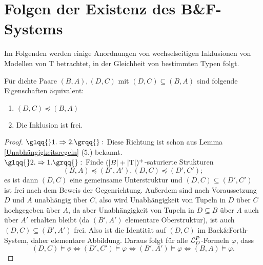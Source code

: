 \section{Folgen der Existenz des B\&F-Systems}
Im Folgenden werden einige Anordnungen von wechselseitigen Inklusionen von Modellen von T betrachtet, in der Gleichheit von bestimmten Typen folgt.

\begin{lemma}\label{freie Inklusionen}
	Für dichte Paare $(B,A),(D,C)$ mit $(D,C)\subseteq(B,A)$ sind folgende Eigenschaften äquivalent:
	\begin{enumerate}
		\item $(D,C)\preceq(B,A)$
		\item Die Inklusion ist frei.
	\end{enumerate}
\end{lemma}
\begin{proof}
	$\glqq{}1.\Rightarrow2.\grqq{}:$ Diese Richtung ist schon aus Lemma \ref{Unabhängigkeitsregeln} (5.) bekannt.\\
	$\glqq{}2.\Rightarrow1.\grqq{}:$ Finde $({\left| B \right|}+{\left| \operatorname{T} \right|})^+$-saturierte Strukturen $$(B,A)\preceq(B',A'),(D,C)\preceq(D',C');$$ es ist dann $(D,C)$ eine gemeinsame Unterstruktur und $(D,C)\subseteq(D',C')$ ist frei nach dem Beweis der Gegenrichtung. Außerdem sind nach Voraussetzung $D$ und $A$ unabhängig über $C$, also wird Unabhängigkeit von Tupeln in $D$ über $C$ \glqq{}hochgegeben\grqq{} über $A$, da aber Unabhängigkeit von Tupeln in $D\subseteq B$ über $A$ auch über $A'$ erhalten bleibt (da $(B',A')$ elementare Oberstruktur), ist auch $(D,C)\subseteq(B',A')$ frei. Also ist die Identität auf $(D,C)$ im Back\&Forth-System, daher elementare Abbildung. Daraus folgt für alle $\mathcal{L}^P_D$-Formeln $\varphi$, dass $$(D,C)\models\phi\Leftrightarrow(D',C')\models\varphi\Leftrightarrow(B',A')\models\varphi\Leftrightarrow(B,A)\models\varphi.$$
\end{proof}

